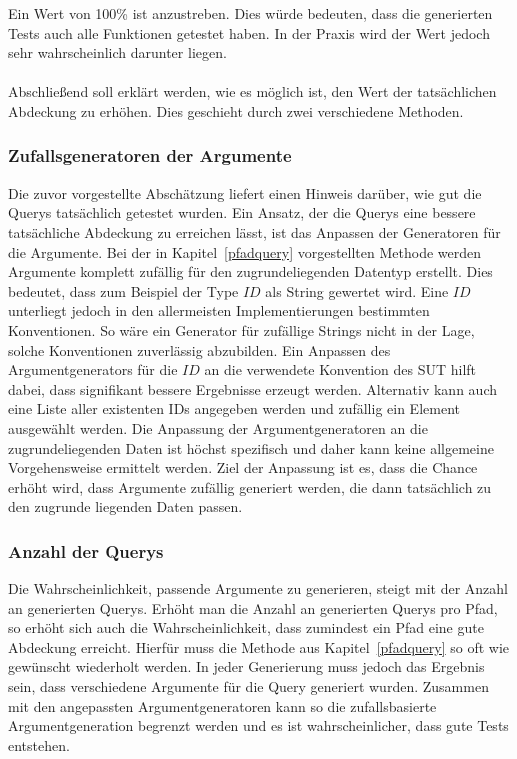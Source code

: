 Ein Wert von 100\% ist anzustreben.
Dies würde bedeuten, dass die generierten Tests auch alle Funktionen getestet haben.
In der Praxis wird der Wert jedoch sehr wahrscheinlich darunter liegen.
\\
\\

Abschließend soll erklärt werden, wie es möglich ist, den Wert der tatsächlichen Abdeckung zu erhöhen.
Dies geschieht durch zwei verschiedene Methoden.

\subsubsection{Zufallsgeneratoren der Argumente}
\label{zufallsgen}

Die zuvor vorgestellte Abschätzung liefert einen Hinweis darüber, wie gut die Querys tatsächlich getestet wurden.
Ein Ansatz, der die Querys eine bessere tatsächliche Abdeckung zu erreichen lässt, ist das Anpassen der Generatoren für die Argumente.
Bei der in Kapitel~\ref{pfadquery} vorgestellten Methode werden Argumente komplett zufällig für den zugrundeliegenden Datentyp erstellt.
Dies bedeutet, dass zum Beispiel der Type $ID$ als String gewertet wird.
Eine $ID$ unterliegt jedoch in den allermeisten Implementierungen bestimmten Konventionen.
So wäre ein Generator für zufällige Strings nicht in der Lage, solche Konventionen zuverlässig abzubilden.
Ein Anpassen des Argumentgenerators für die $ID$ an die verwendete Konvention des SUT hilft dabei, dass signifikant bessere Ergebnisse erzeugt werden.
Alternativ kann auch eine Liste aller existenten IDs angegeben werden und zufällig ein Element ausgewählt werden.
Die Anpassung der Argumentgeneratoren an die zugrundeliegenden Daten ist höchst spezifisch und daher kann keine allgemeine
Vorgehensweise ermittelt werden.
Ziel der Anpassung ist es, dass die Chance erhöht wird, dass Argumente zufällig generiert werden, die dann tatsächlich zu den zugrunde liegenden Daten passen.

\subsubsection{Anzahl der Querys}

Die Wahrscheinlichkeit, passende Argumente zu generieren, steigt mit der Anzahl an generierten Querys.
Erhöht man die Anzahl an generierten Querys pro Pfad, so erhöht sich auch die Wahrscheinlichkeit, dass zumindest ein Pfad eine gute Abdeckung erreicht.
Hierfür muss die Methode aus Kapitel~\ref{pfadquery} so oft wie gewünscht wiederholt werden.
In jeder Generierung muss jedoch das Ergebnis sein, dass verschiedene Argumente für die Query generiert wurden.
Zusammen mit den angepassten Argumentgeneratoren kann so die zufallsbasierte Argumentgeneration begrenzt werden
und es ist wahrscheinlicher, dass gute Tests entstehen.



